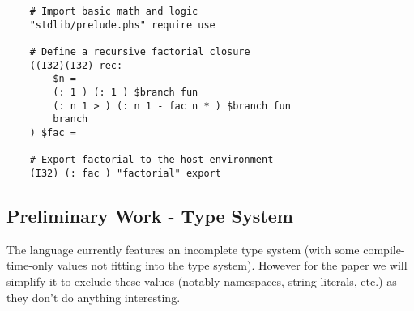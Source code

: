 \documentclass{article}
\begin{document}
    \begin{verbatim}
    # Import basic math and logic
    "stdlib/prelude.phs" require use

    # Define a recursive factorial closure
    ((I32)(I32) rec:
        $n =
        (: 1 ) (: 1 ) $branch fun
        (: n 1 > ) (: n 1 - fac n * ) $branch fun
        branch
    ) $fac =
    
    # Export factorial to the host environment
    (I32) (: fac ) "factorial" export
    \end{verbatim}
    
    
\subsection{Preliminary Work - Type System}
The language currently features an incomplete type system (with some compile-time-only values not fitting into the type system). However for the paper we will simplify it to exclude these values (notably namespaces, string literals, etc.) as they don't do anything interesting.
\end{document}
